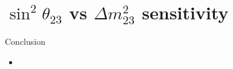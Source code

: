 \documentclass{beamer}
\newcommand{\sinsqthetatwothree}{$\sin^2\theta_{23}$\xspace}
\newcommand{\dmsqtwothree}{$\Delta m^2_{23}$\xspace}
\begin{document}
\section{\sinsqthetatwothree vs \dmsqtwothree sensitivity}
\begin{frame}{Conclusion}
	\centering
	\begin{itemize}
		\item 
	\end{itemize}
\end{frame}
\end{document}
